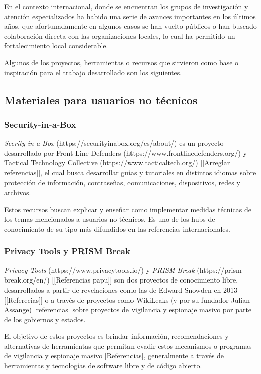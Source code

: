 \documentclass[12pt]{caltech_thesis}
\begin{document}
En el contexto internacional, donde se encuentran los grupos de investigación y atención especializados ha habido una serie de avances importantes en los últimos años, que afortunadamente en algunos casos se han vuelto públicos o han buscado colaboración directa con las organizaciones locales, lo cual ha permitido un fortalecimiento local considerable.

Algunos de los proyectos, herramientas o recursos que sirvieron como base o inspiración para el trabajo desarrollado son los siguientes.

\subsection{Materiales para usuarios no técnicos}

\subsubsection{Security-in-a-Box}

\textit{Secrity-in-a-Box} (https://securityinabox.org/es/about/) es un proyecto desarrollado por Front Line Defenders (https://www.frontlinedefenders.org/) y Tactical Technology Collective (https://www.tacticaltech.org/) [[Arreglar referencias]], el cual busca desarrollar guías y tutoriales en distintos idiomas sobre protección de información, contraseñas, comunicaciones, dispositivos, redes y archivos.

Estos recursos buscan explicar y enseñar como implementar medidas técnicas de los temas mencionados a usuarios no técnicos. Es uno de los hubs de conocimiento de su tipo más difundidos en las referencias internacionales.

\subsubsection{Privacy Tools y PRISM Break}

\textit{Privacy Tools} (https://www.privacytools.io/) y \textit{PRISM Break} (https://prism-break.org/en/) [[Referencias papu]] son dos proyectos de conocimiento libre, desarrollados a partir de revelaciones como las de Edward Snowden en 2013 [[Referecias]] o a través de proyectos como WikiLeaks (y por su fundador Julian Assange) [referencias] sobre proyectos de vigilancia y espionaje masivo por parte de los gobiernos y estados.

El objetivo de estos proyectos es brindar información, recomendaciones y alternativas de herramientas que permitan evadir estos mecanismos o programas de vigilancia y espionaje masivo [Referencias], generalmente a través de herramientas y tecnologías de software libre y de código abierto.
\end{document}
